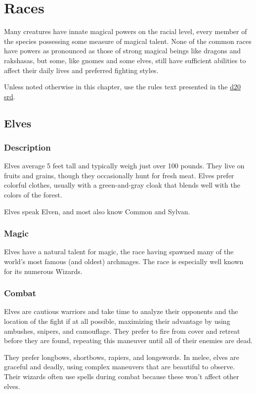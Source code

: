 \section{Races}
Many creatures have innate magical powers on the racial level, every member of the species possessing some measure of magical talent. None of the common races have powers as pronounced as those of strong magical beings like dragons and rakshasas, but some, like gnomes and some elves, still have sufficient abilities to affect their daily lives and preferred fighting styles.

Unless noted otherwise in this chapter, use the rules text presented in the \href{http://www.wizards.com/default.asp?x=d20/article/srd35}{d20 srd}.
\subsection{Elves}
\subsubsection{Description}
Elves average 5 feet tall and typically weigh just over 100 pounds. They live on fruits and grains, though they occasionally hunt for fresh meat. Elves prefer colorful clothes, usually with a green-and-gray cloak that blends well with the colors of the forest.

Elves speak Elven, and most also know Common and Sylvan.
\subsubsection{Magic}
Elves have a natural talent for magic, the race having spawned many of the world's most famous (and oldest) archmages. The race is especially well known for its numerous Wizards.
\subsubsection{Combat}
Elves are cautious warriors and take time to analyze their opponents and the location of the fight if at all possible, maximizing their advantage by using ambushes, snipers, and camouflage. They prefer to fire from cover and retreat before they are found, repeating this maneuver until all of their enemies are dead.

They prefer longbows, shortbows, rapiers, and longswords. In melee, elves are graceful and deadly, using complex maneuvers that are beautiful to observe. Their wizards often use  spells during combat because these won't affect other elves.
